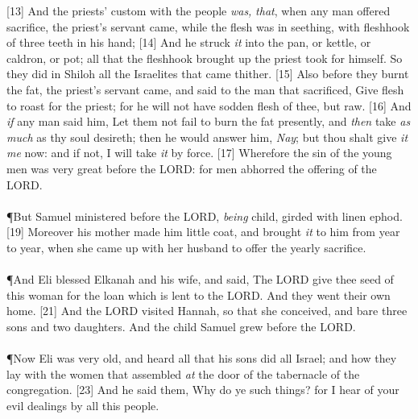 [13] \textcolor[cmyk]{0.99998,1,0,0}{And the priests' custom with the people \emph{was,} \emph{that}, when any man offered sacrifice, the priest's servant came, while the flesh was in seething, with  fleshhook of three teeth in his hand;}
[14] \textcolor[cmyk]{0.99998,1,0,0}{And he struck \emph{it} into the pan, or kettle, or caldron, or pot; all that the fleshhook brought up the priest took for himself. So they did in Shiloh  all the Israelites that came thither.}
[15] \textcolor[cmyk]{0.99998,1,0,0}{Also before they burnt the fat, the priest's servant came, and said to the man that sacrificed, Give flesh to roast for the priest; for he will not have sodden flesh of thee, but raw.}
[16] \textcolor[cmyk]{0.99998,1,0,0}{And \emph{if} any man said  him, Let them not fail to burn the fat presently, and \emph{then} take \emph{as} \emph{much} as thy soul desireth; then he would answer him, \emph{Nay}; but thou shalt give \emph{it} \emph{me} now: and if not, I will take \emph{it} by force.}
[17] \textcolor[cmyk]{0.99998,1,0,0}{Wherefore the sin of the young men was very great before the LORD: for men abhorred the offering of the LORD.}\\
\\
\P \textcolor[cmyk]{0.99998,1,0,0}{But Samuel ministered before the LORD, \emph{being}  child, girded with  linen ephod.}
[19] \textcolor[cmyk]{0.99998,1,0,0}{Moreover his mother made him  little coat, and brought \emph{it} to him from year to year, when she came up with her husband to offer the yearly sacrifice.}\\
\\
\P \textcolor[cmyk]{0.99998,1,0,0}{And Eli blessed Elkanah and his wife, and said, The LORD give thee seed of this woman for the loan which is lent to the LORD. And they went  their own home.}
[21] \textcolor[cmyk]{0.99998,1,0,0}{And the LORD visited Hannah, so that she conceived, and bare three sons and two daughters. And the child Samuel grew before the LORD.}\\
\\
\P \textcolor[cmyk]{0.99998,1,0,0}{Now Eli was very old, and heard all that his sons did  all Israel; and how they lay with the women that assembled \emph{at} the door of the tabernacle of the congregation.}
[23] \textcolor[cmyk]{0.99998,1,0,0}{And he said  them, Why do ye such things? for I hear of your evil dealings by all this people.}
